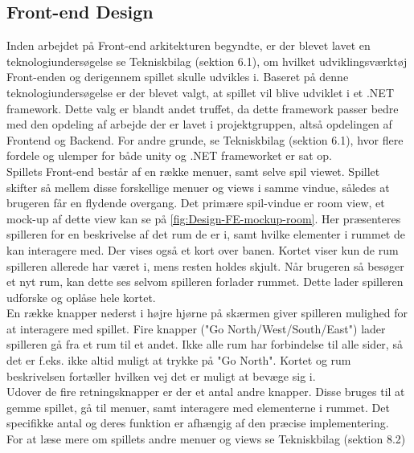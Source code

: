 \subsection{Front-end Design}
\label{ssec:FE Design}

Inden arbejdet på Front-end arkitekturen begyndte, er der blevet lavet en teknologiundersøgelse se Tekniskbilag (sektion 6.1), om hvilket udviklingsværktøj Front-enden og derigennem spillet skulle udvikles i. Baseret på denne teknologiundersøgelse er der blevet valgt, at spillet vil blive udviklet i et .NET framework. Dette valg er blandt andet truffet, da dette framework passer bedre med den opdeling af arbejde der er lavet i projektgruppen, altså opdelingen af Frontend og Backend. For andre grunde, se Tekniskbilag (sektion 6.1), hvor flere fordele og ulemper for både unity og .NET frameworket er sat op.\\

\noindent Spillets Front-end består af en række menuer, samt selve spil viewet. Spillet skifter så mellem disse forskellige menuer og views i samme vindue, således at brugeren får en flydende overgang.
Det primære spil-vindue er room view, et mock-up af dette view kan se på \autoref{fig:Design-FE-mockup-room}. Her præsenteres spilleren for en beskrivelse af det rum de er i, samt hvilke elementer i rummet de kan interagere med. Der vises også et kort over banen. Kortet viser kun de rum spilleren allerede har været i, mens resten holdes skjult. Når brugeren så besøger et nyt rum, kan dette ses selvom spilleren forlader rummet. Dette lader spilleren udforske og oplåse hele kortet.\\
En række knapper nederst i højre hjørne på skærmen giver spilleren mulighed for at interagere med spillet. Fire knapper ("Go {North/West/South/East}") lader spilleren gå fra et rum til et andet. Ikke alle rum har forbindelse til alle sider, så det er f.eks. ikke altid muligt at trykke på "Go North". Kortet og rum beskrivelsen fortæller hvilken vej det er muligt at bevæge sig i.\\
Udover de fire retningsknapper er der et antal andre knapper. Disse bruges til at gemme spillet, gå til menuer, samt interagere med elementerne i rummet. Det specifikke antal og deres funktion er afhængig af den præcise implementering.\\

\noindent For at læse mere om spillets andre menuer og views se Tekniskbilag (sektion 8.2)

